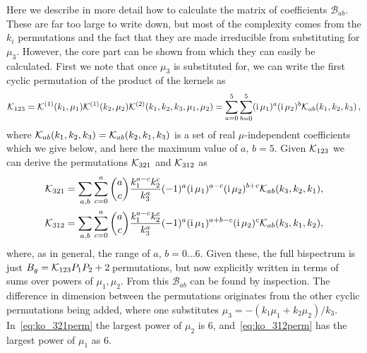 Here we describe in more detail how to calculate the matrix of coefficients $\mathcal{B}_{ab}$. These are far too large to write down, but most of the complexity comes from the $k_i$ permutations and the fact that they are made irreducible from substituting for $\mu_3$. However, the core part can be shown from which they can easily be calculated. First we note that once $\mu_3$ is substituted for, we can write the first cyclic permutation of the product of the kernels as  
\begin{equation}
	\mathcal{K}_{123}=\mathcal{K}^{(1)}(k_1,\mu_1)\mathcal{K}^{(1)}(k_2,\mu_2)\mathcal{K}^{(2)}(k_1,k_2,k_3,\mu_1,\mu_2)= \sum_{a=0}^5\sum_{b=0}^5 (\mathrm{i\,} \mu_1)^a (\mathrm{i\,} \mu_2)^b \mathcal{K}_{ab}(k_1,k_2,k_3)\,,
\end{equation}
where \(\mathcal{K}_{ab}(k_1,k_2,k_3)=\mathcal{K}_{ab}(k_2,k_1,k_3)\) is a set of real \(\mu\)-independent coefficients which we give below, and here the maximum value of \(a,\,b = 5\). Given $\mathcal{K}_{123}$ we can derive the permutations $\mathcal{K}_{321}$ and $\mathcal{K}_{312}$ as
\begin{align}
	&\mathcal{K}_{321} = \sum_{a,b} \sum_{c=0}^a \binom{a}{c} \frac{k_1^{a-c} k_2^c}{k_3^a} (-1)^a (\mathrm{i\,} \mu_1)^{a-c} (\mathrm{i\,} \mu_2)^{b+c} \mathcal{K}_{ab}(k_3,k_2,k_1)\label{eq:ko_321perm}, \\
	&\mathcal{K}_{312} = \sum_{a,b} \sum_{c=0}^a \binom{a}{c} \frac{k_1^{a-c} k_2^c}{k_3^a} (-1)^a (\mathrm{i\,} \mu_1)^{a+b-c} (\mathrm{i\,} \mu_2)^{c} \mathcal{K}_{ab}(k_3,k_1,k_2),\label{eq:ko_312perm}
\end{align} 
where, as in general, the range of \(a,\,b = 0 \dots 6\).
Given these, the full bispectrum is just $B_g=\mathcal{K}_{123}P_1P_2+2\,$permutations, but now explicitly written in terms of sums over powers of $\mu_1,\mu_2$.  From this $\mathcal{B}_{ab}$ can be found by inspection. The difference in dimension between the permutations originates from the other cyclic permutations being added, where one substitutes \(\mu_3 = - \left( k_1 \mu_1 + k_2 \mu_2 \right)/k_3\). In~\eqref{eq:ko_321perm}  the largest power of $\mu_2$ is 6, and~\eqref{eq:ko_312perm} has the largest power of $\mu_1$ as 6.

